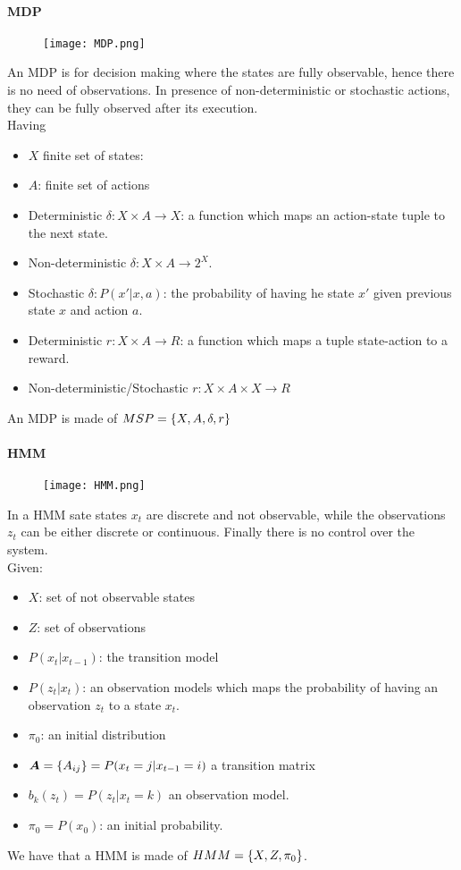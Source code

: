 \paragraph{MDP}
\begin{figure}[H]
    \centering
    \texttt{[image: MDP.png]}
\end{figure}

An MDP is for decision making where the states are fully observable, hence there is  no need of observations. In presence of non-deterministic or stochastic actions, they can be fully observed after its execution.\\
Having 
\begin{itemize}
\item $X$ finite set of states:
\item $A$: finite set of actions
\item Deterministic $\delta: X\times A \rightarrow X$: a function which maps an action-state tuple to the next state.
\item Non-deterministic $\delta: X\times A \rightarrow 2^X$.
\item Stochastic $\delta: P(x'|x,a)$: the probability of having he state $x'$ given previous state $x$ and action $a$.
\item Deterministic $r:X\times A \rightarrow R$: a function which maps a tuple state-action to a reward.
\item Non-deterministic/Stochastic $r:X\times A \times X \rightarrow R$
\end{itemize}
An MDP is made of $MSP=\lbrace{X,A,\delta,r}\rbrace$

\paragraph{HMM}
\begin{figure}[H]
    \centering
    \texttt{[image: HMM.png]}
\end{figure}

In a HMM sate states $x_t$ are discrete and not observable, while the observations $z_t$ can be either discrete or continuous. Finally there is no control over the system.\\
Given:
\begin{itemize}
\item $X$: set of not observable states
\item $Z$: set of observations
\item $P(x_t|x_{t-1})$: the transition model 
\item $P(z_t|x_t)$: an observation models which maps the probability of having an observation $z_t$ to a state $x_t$.
\item $\pi_0$: an initial distribution
\item $\bm{A}=\lbrace{A_{ij}}\rbrace=P(x_t=j|x_{t-1}=i)$ a transition matrix
\item $b_k(z_t)=P(z_t|x_t=k)$ an observation model.
\item $\pi_0=P(x_0)$: an initial probability.
\end{itemize}
We have that a HMM is made of $HMM=\lbrace{X,Z,\pi_0}\rbrace$.

